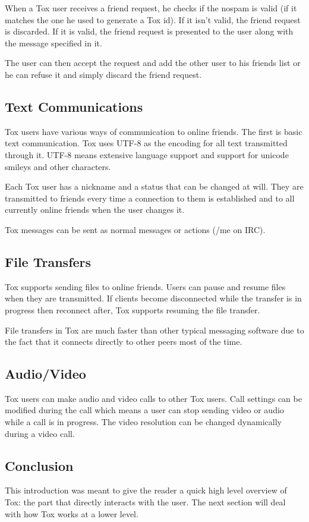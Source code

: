 \documentclass{tox}
\begin{document}
When a Tox user receives a friend request, he checks if the nospam is valid (if 
it matches the one he used to generate a Tox id). If it isn't valid, the friend 
request is discarded. If it is valid, the friend request is presented to the 
user along with the message specified in it.

The user can then accept the request and add the other user to his friends list 
or he can refuse it and simply discard the friend request.

\subsection{Text Communications}

Tox users have various ways of communication to online friends. The first is 
basic text communication. Tox uses UTF-8 as the encoding for all text 
transmitted through it. UTF-8 means extensive language support and support for 
unicode smileys and other characters.

Each Tox user has a nickname and a status that can be changed at will. They are 
transmitted to friends every time a connection to them is established and to 
all currently online friends when the user changes it.

Tox messages can be sent as normal messages or actions (/me on IRC).

\subsection{File Transfers}

Tox supports sending files to online friends. Users can pause and resume files 
when they are transmitted. If clients become disconnected while the transfer is 
in progress then reconnect after, Tox supports resuming the file transfer.

File transfers in Tox are much faster than other typical messaging software due 
to the fact that it connects directly to other peers most of the time.

\subsection{Audio/Video}

Tox users can make audio and video calls to other Tox users. Call settings can 
be modified during the call which means a user can stop sending video or audio 
while a call is in progress. The video resolution can be changed dynamically 
during a video call.

\subsection{Conclusion}

This introduction was meant to give the reader a quick high level overview of 
Tox: the part that directly interacts with the user. The next section will deal 
with how Tox works at a lower level.
\end{document}
